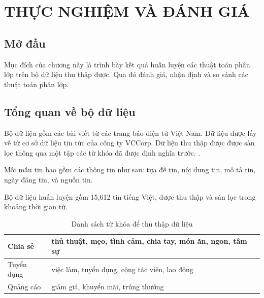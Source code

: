 \chapter{THỰC NGHIỆM VÀ ĐÁNH GIÁ}
\ifpdf
    \graphicspath{{Chapter4/Chapter4Figs/PNG/}{Chapter4/Chapter4Figs/PDF/}{Chapter4/Chapter4Figs/}}
\else
    \graphicspath{{Chapter4/Chapter4Figs/EPS/}{Chapter4/Chapter4Figs/}}
\fi

\section{Mở đầu}
Mục đích của chương này là trình bày kết quả huấn luyện các thuật toán phân lớp trên bộ dữ liệu thu thập được. Qua đó đánh giá, nhận định và so sánh các thuật toán phân lớp.

\section{Tổng quan về bộ dữ liệu}
Bộ dữ liệu gồm các bài viết từ các trang báo điện tử Việt Nam. Dữ liệu được lấy về từ cơ sở dữ liệu tin tức của công ty VCCorp\@. Dữ liệu thu thập được được sàn lọc thông qua một tập các từ khóa đã được định nghĩa trước. \cite{TDT2004Annotation}. %

Mỗi mẫu tin bao gồm các thông tin như sau: tựa đề tin, nội dung tin, mô tả tin, ngày đăng tin, và nguồn tin.

Bộ dữ liệu huấn luyện gồm 15,612 tin tiếng Việt, được thu thập và sàn lọc trong khoảng thời gian từ.


	\begin{table}[H]
		\setlength\extrarowheight{3pt}
		\begin{tabular}{|p{4cm}|p{10cm}|}
			\hline
			Chia sẻ      & thủ thuật, mẹo, tình cảm, chia tay, món ăn, ngon, tâm sự \\
			\hline
			Tuyển dụng   & việc làm, tuyển dụng, cộng tác viên, lao động \\ 
			\hline
			Quảng cáo & giảm giá, khuyển mãi, trúng thưởng \\
			\hline
		\end{tabular}%
		\caption{Danh sách từ khóa để thu thập dữ liệu}
		\label{tab:twitterkeywords}%
	\end{table}%

